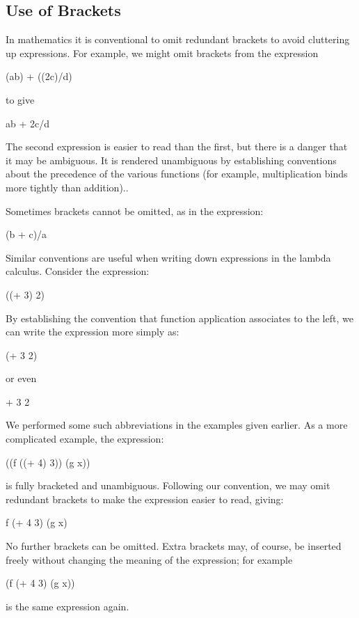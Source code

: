 \subsection{Use of Brackets}

In mathematics it is conventional to omit redundant brackets to avoid
cluttering up expressions. For example, we might omit brackets from the
expression
\begin{mlcoded}
	(ab) + ((2c)/d)
\end{mlcoded}
to give
\begin{mlcoded}
	ab + 2c/d
\end{mlcoded}
The second expression is easier to read than the first, but there is a danger that
it may be ambiguous. It is rendered unambiguous by establishing conventions
about the precedence of the various functions (for example, multiplication
binds more tightly than addition)..

Sometimes brackets cannot be omitted, as in the expression:
\begin{mlcoded}
	(b + c)/a
\end{mlcoded}
Similar conventions are useful when writing down expressions in the
lambda calculus. Consider the expression:
\begin{mlcoded}
	((+ 3) 2)
\end{mlcoded}
By establishing the convention that function application associates to the left,
we can write the expression more simply as:
\begin{mlcoded}
	(+ 3 2)
\end{mlcoded}
or even
\begin{mlcoded}
	+ 3 2
\end{mlcoded}

We performed some such abbreviations in the examples given earlier. As a
more complicated example, the expression:
\begin{mlcoded}
	((f ((+ 4) 3)) (g x))
\end{mlcoded}
is fully bracketed and unambiguous. Following our convention, we may omit
redundant brackets to make the expression easier to read, giving:
\begin{mlcoded}
	f (+ 4 3) (g x)
\end{mlcoded}
No further brackets can be omitted. Extra brackets may, of course, be
inserted freely without changing the meaning of the expression; for example
\begin{mlcoded}
	(f (+ 4 3) (g x))
\end{mlcoded}
is the same expression again.

